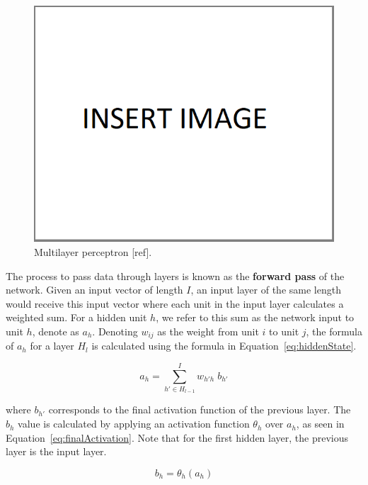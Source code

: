 \begin{figure}[!h]
    \centering
    \includegraphics[scale=.45]{imagenes/insertImage.png}
    \caption{Multilayer perceptron [ref].}
    \label{fig:multilayerPerceptron}
\end{figure}

The process to pass data through layers is known as the \textbf{forward pass} of the network. 
Given an input vector of length $I$, an input layer of the same length would receive this 
input vector where each unit in the input layer calculates a weighted sum. For a hidden unit 
$h$, we refer to this sum as the network input to unit $h$, denote as $a_h$. Denoting $w_{ij}$ 
as the weight from unit $i$ to unit $j$, the formula of $a_h$ for a layer $H_{l}$ is calculated 
using the formula in Equation~\ref{eq:hiddenState}.

\begin{equation} \label{eq:hiddenState}
    a_h = \sum_{h' \in H_{l-1}}^I w_{h'h} \; b_{h'}
\end{equation}

where $b_{h'}$ corresponds to the final activation function of the previous layer. The $b_h$ 
value is calculated by applying an activation function $\theta_h$ over $a_h$, as seen in 
Equation~\ref{eq:finalActivation}. Note that for the first hidden layer, the previous layer 
is the input layer.

\begin{equation} \label{eq:finalActivation}
    b_h = \theta_h(a_h)
\end{equation}

